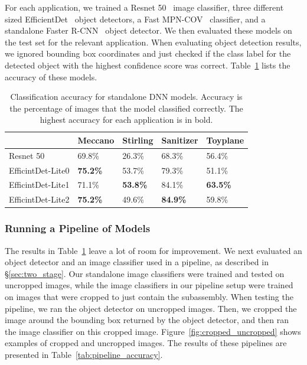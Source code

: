 For each application, we trained a Resnet 50~\cite{He2016} image classifier,
three different sized EfficientDet~\cite{Tan2020} object detectors, a
Fast MPN-COV~\cite{Li_2018_CVPR} classifier, and a standalone Faster
R-CNN~\cite{frcnn} object detector.
We then evaluated these models on the test set for the relevant application.
When evaluating object detection results, we ignored bounding box coordinates
and just checked if the class label for the detected object with the highest
confidence score was correct.
Table~\ref{tab:standalone_accuracy} lists the accuracy of these models.

\begin{table}
\begin{tabular}{|l||l|l|l|l|}
\hline
  & Meccano & Stirling & Sanitizer & Toyplane\\
  \hline
  \hline
  Resnet 50 & 69.8\% & 26.3\% & 68.3\% & 56.4\%\\
  EfficintDet-Lite0 & \textbf{75.2\%} & 53.7\% & 79.3\% & 51.1\%\\
  EfficintDet-Lite1 & 71.1\% & \textbf{53.8\%} & 84.1\% & \textbf{63.5\%}\\
  EfficintDet-Lite2 & \textbf{75.2\%} & 49.6\% & \textbf{84.9\%} & 59.8\%\\
  \hline
\end{tabular}
  \caption{
    Classification accuracy for standalone DNN models.
    Accuracy is the percentage of images that the model classified correctly.
    The highest accuracy for each application is in bold.
  }\label{tab:standalone_accuracy}
\end{table}

\subsubsection{Running a Pipeline of Models}

The results in Table~\ref{tab:standalone_accuracy} leave a lot of room for
improvement.
We next evaluated an object detector and an image classifier used in a pipeline,
as described in \S\ref{sec:two_stage}.
Our standalone image classifiers were trained and tested
on uncropped images, while the image classifiers in our pipeline setup were
trained on images that were cropped to just contain the subassembly.
When testing the pipeline, we ran the object detector on uncropped images.
Then, we cropped the image around the bounding box returned by the object
detector, and then ran the image classifier on this cropped image.
Figure~\ref{fig:cropped_uncropped} shows examples of cropped and uncropped
images.
The results of these pipelines are presented in
Table~\ref{tab:pipeline_accuracy}.

